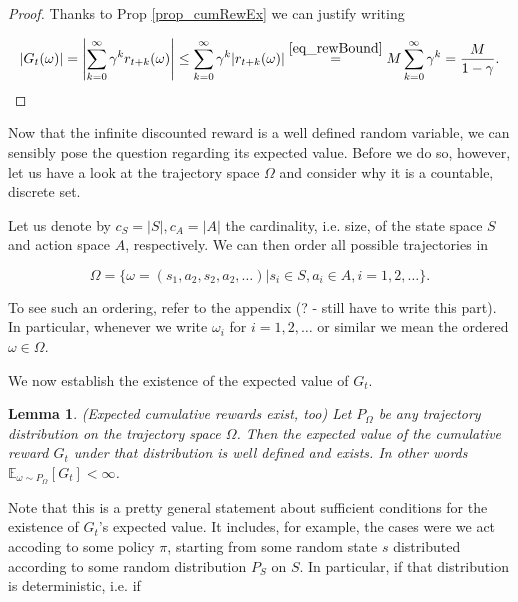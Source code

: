 \documentclass[11pt]{article} %
\newtheorem{lem}{Lemma}
\begin{document}
\begin{proof}
	Thanks to Prop \ref{prop_cumRewEx} we can justify writing

\begin{equation}
	|G_t(\omega)| = \left|\sum_{k=0}^{\infty} \gamma^k r_{t+k}(\omega) \right| \le \sum_{k=0}^{\infty} \gamma^k |r_{t+k}(\omega)| \overset{\ref{eq_rewBound}}{=} M \sum_{k=0}^{\infty} \gamma^k = \frac{M}{1 - \gamma}.
\end{equation}

\end{proof}

Now that the infinite discounted reward is a well defined random variable, we can sensibly pose the question regarding its expected value. Before we do so, however, let us have a look at the trajectory space $\Omega$ and consider why it is a countable, discrete set.

Let us denote by $c_S = |S|, c_A = |A|$ the cardinality, i.e. size, of the state space $S$ and action space $A$, respectively. We can then order all possible trajectories in 

\begin{equation}\label{def_traj}
	\Omega = \{ \omega = (s_1, a_2, s_2, a_2, \dots) | s_i \in S, a_i \in A, i=1,2,\dots \}.
\end{equation}

To see such an ordering, refer to the appendix (? - still have to write this part). In particular, whenever we write $\omega_i$ for $i = 1,2,\dots$ or similar we mean the ordered $\omega \in \Omega$.

We now establish the existence of the expected value of $G_t$.

\begin{lem}\label{lem_expCumRew}{(Expected cumulative rewards exist, too)}
	Let $P_\Omega$ be any trajectory distribution on the trajectory space $\Omega$. Then the expected value of the cumulative reward $G_t$ under that distribution is well defined and exists. In other words $\mathbb{E}_{\omega \sim P_{\Omega}}[G_t] < \infty$.
\end{lem}

Note that this is a pretty general statement about sufficient conditions for the existence of $G_t$'s expected value. It includes, for example, the cases were we act accoding to some policy $\pi$, starting from some random state $s$ distributed according to some random distribution $P_S$ on $S$. In particular, if that distribution is deterministic, i.e. if 
\end{document}

